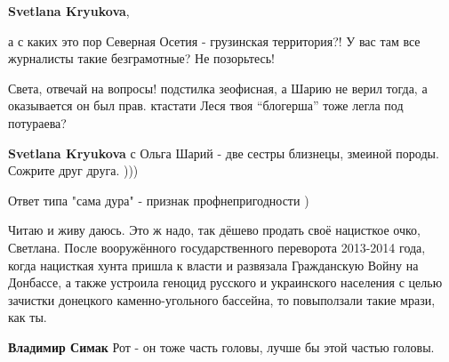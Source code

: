 \begin{itemize}
\begin{itemize}
\textbf{Svetlana Kryukova}, 

а с каких это пор Северная Осетия - грузинская территория?! У вас там все
журналисты такие безграмотные? Не позорьтесь!


 
Света, отвечай на вопросы! подстилка зеофисная, а Шарию не верил тогда, а
оказывается он был прав. ктастати Леся твоя \enquote{блогерша} тоже легла под потураева?

 
\textbf{Svetlana Kryukova} с Ольга Шарий - две сестры близнецы, змеиной породы. Сожрите друг друга. )))

 
Ответ типа "сама дура" - признак профнепригодности )

 

Читаю и живу даюсь. Это ж надо, так дёшево продать своё нацисткое очко,
Светлана. После вооружённого государственного переворота 2013-2014 года, когда
нацисткая хунта пришла к власти и развязала Гражданскую Войну на Донбассе, а
также устроила геноцид русского и украинского населения с целью зачистки
донецкого каменно-угольного бассейна, то повыползали такие мрази, как ты.


 
\textbf{Владимир Симак} Рот - он тоже часть головы, лучше бы этой частью головы.

 

\end{itemize}
\end{itemize}
